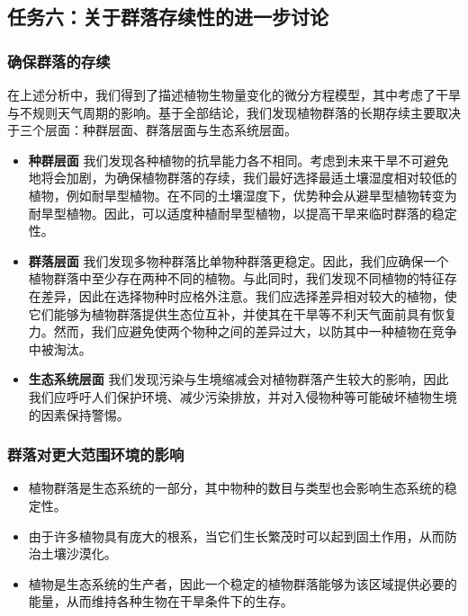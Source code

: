\documentclass[11pt,a4paper]{ctexart}
\begin{document}
\subsection{任务六：关于群落存续性的进一步讨论}

\subsubsection{确保群落的存续}

在上述分析中，我们得到了描述植物生物量变化的微分方程模型，其中考虑了干旱与不规则天气周期的影响。基于全部结论，我们发现植物群落的长期存续主要取决于三个层面：种群层面、群落层面与生态系统层面。

\begin{itemize}
\item \textbf{种群层面} 我们发现各种植物的抗旱能力各不相同。考虑到未来干旱不可避免地将会加剧，为确保植物群落的存续，我们最好选择最适土壤湿度相对较低的植物，例如耐旱型植物。在不同的土壤湿度下，优势种会从避旱型植物转变为耐旱型植物。因此，可以适度种植耐旱型植物，以提高干旱来临时群落的稳定性。
\item \textbf{群落层面} 我们发现多物种群落比单物种群落更稳定。因此，我们应确保一个植物群落中至少存在两种不同的植物。与此同时，我们发现不同植物的特征存在差异，因此在选择物种时应格外注意。我们应选择差异相对较大的植物，使它们能够为植物群落提供生态位互补，并使其在干旱等不利天气面前具有恢复力。然而，我们应避免使两个物种之间的差异过大，以防其中一种植物在竞争中被淘汰。
\item \textbf{生态系统层面} 我们发现污染与生境缩减会对植物群落产生较大的影响，因此我们应呼吁人们保护环境、减少污染排放，并对入侵物种等可能破坏植物生境的因素保持警惕。
\end{itemize}

\subsubsection{群落对更大范围环境的影响}

\begin{itemize}
\item 植物群落是生态系统的一部分，其中物种的数目与类型也会影响生态系统的稳定性。
\item 由于许多植物具有庞大的根系，当它们生长繁茂时可以起到固土作用，从而防治土壤沙漠化。
\item 植物是生态系统的生产者，因此一个稳定的植物群落能够为该区域提供必要的能量，从而维持各种生物在干旱条件下的生存。
\end{itemize}
\end{document}
